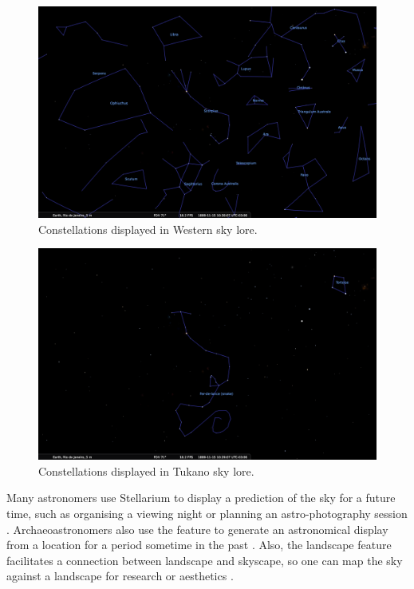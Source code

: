 \documentclass[10pt,a4paper,extrafontsizes]{memoir}
\begin{document}
\begin{figure}[htbp]
	\centering
	\includegraphics[width=1\columnwidth]{WesternCrux}
	\caption{Constellations displayed in Western sky lore.}
	\label{fig:WesternCrux}
\end{figure}

\begin{figure}[htbp]
	\centering
	\includegraphics[width=1\columnwidth]{TukanoTortoise}
	\caption{Constellations displayed in Tukano sky lore.}
	\label{fig:TukanoTortoise}
\end{figure}

Many astronomers use Stellarium to display a prediction of the sky for a future time, such as organising a viewing night or planning an astro-photography session \cite{ashley2015computers}. Archaeoastronomers  also use the feature to generate an astronomical display from a location for a period sometime in the past \cite{zotti2014towards}. Also, the landscape feature facilitates a connection between  landscape and  skyscape, so one can map the sky against a landscape for research or aesthetics \cite{zotti2017skyscape}.
\end{document}
